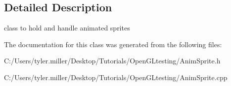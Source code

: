 \subsection{Detailed Description}
class to hold and handle animated sprites 

The documentation for this class was generated from the following files\+:\begin{DoxyCompactItemize}
\item 
C\+:/\+Users/tyler.\+miller/\+Desktop/\+Tutorials/\+Open\+G\+Ltesting/Anim\+Sprite.\+h\item 
C\+:/\+Users/tyler.\+miller/\+Desktop/\+Tutorials/\+Open\+G\+Ltesting/Anim\+Sprite.\+cpp\end{DoxyCompactItemize}
